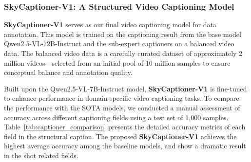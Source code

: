 \documentclass{article}
\begin{document}
{\subsubsection{SkyCaptioner-V1: A Structured Video Captioning Model}
\textbf{SkyCaptioner-V1} serves as our final video captioning model for data annotation. This model is trained on the captioning result from the base model Qwen2.5-VL-72B-Instruct and the sub-expert captioners on a balanced video data. The balanced video data is a carefully curated dataset of approximately 2 million videos—selected from an initial pool of 10 million samples to ensure conceptual balance and annotation quality.

Built upon the Qwen2.5-VL-7B-Instruct model, \textbf{SkyCaptioner-V1} is fine-tuned to enhance performance in domain-specific video captioning tasks. To compare the performance with the SOTA models, we conducted a manual assessment of accuracy across different captioning fields using a test set of 1,000 samples. Table~\ref{tab:captioner_comparison} presents the detailed accuracy metrics of each field in the structural caption. The proposed \textbf{SkyCaptioner-V1} achieves the highest average accuracy among the baseline models, and show a dramatic result in the shot related fields.

}
\end{document}
